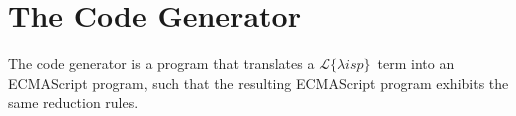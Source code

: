 \documentclass[a4paper]{article}
\newcommand{\lisp}{\ensuremath{\mathcal{L}\{\lambda isp\}}}
\begin{document}
\section{The Code Generator}

The code generator is a program that translates a \lisp\ term into an ECMAScript program, such that the resulting ECMAScript program exhibits the same reduction rules.
\end{document}

